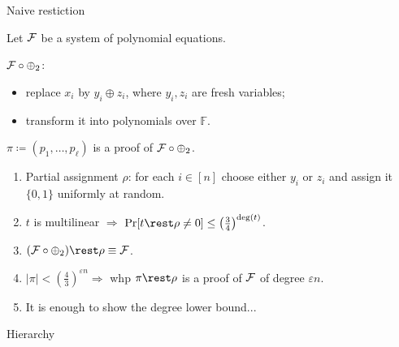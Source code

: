 \begin{frame}{Naive restiction}

    Let $\mathcal{F}$ be a system of polynomial equations.

    $\mathcal{F} \circ \oplus_2$:
    \begin{itemize}
        \item replace $x_i$ by $y_i \oplus z_i$, where $y_i, z_i$ are fresh variables;
        \item transform it into polynomials over $\mathbb{F}$.
    \end{itemize}

    \vspace{0.5cm}
    \pause
    $\pi \coloneqq (p_1, \dots, p_{\ell})$ is a proof of $\mathcal{F} \circ \oplus_2$.
    \pause
    \begin{enumerate}            
        \item Partial assignment $\rho$: for each $i \in [n]$ choose either $y_i$ or $z_i$ and assign it
            $\{0, 1\}$ uniformly at random.
        \pause
        \item $t$ is multilinear $\Rightarrow$ $\Pr[t\rest \rho \neq 0] \le
            \left(\frac{3}{4}\right)^{\deg(t)}$.
        \item $(\Fs \circ \oplus_2) \rest \rho \equiv \Fs$.
        \pause
        \item $|\pi| < (\frac{4}{3})^{\varepsilon n} \Rightarrow$ whp $\pi\rest \rho$ is a proof of $\mathcal{F}$
            of degree $\varepsilon n$.
        \pause
        \item It is enough to show the degree lower bound...
    \end{enumerate}    
\end{frame}


\begin{frame}{Hierarchy}

    
    
\end{frame}